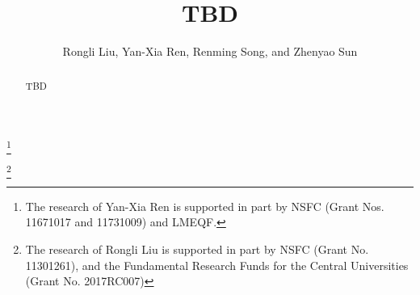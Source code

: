 \documentclass[12pt,a4paper]{amsart}
\numberwithin{equation}{section}
\theoremstyle{plain}
\theoremstyle{definition}
\theoremstyle{remark}
\begin{document}
\title{TBD} %
\author[R. Liu, Y.-X. Ren, R. Song, and Z. Sun]{Rongli Liu, Yan-Xia Ren, Renming Song, and Zhenyao Sun}
\address{Yan-Xia Ren\\ LMAM School of Mathematical Sciences \& Center for
Statistical Science\\ Peking University\\ Beijing 100871\\ P. R. China}
\thanks{The research of Yan-Xia Ren is supported in part by NSFC (Grant Nos. 11671017 and 11731009)  and LMEQF.}
\address{Rongli Liu\\ Mathematics and Applied Mathematics\\ Beijing jiaotong University\\ Beijing 100044\\ P. R. China}
\thanks{The research of Rongli Liu is supported in part by NSFC (Grant No. 11301261), and the Fundamental Research Funds for the Central Universities (Grant No.  2017RC007)}
\address{Renming Song\\ Department of Mathematics\\ University of Illinois at Urbana-Champaign \\ Urbana \\ IL 61801\\ USA}
\address{Zhenyao Sun\\ Faculty of Industrial Engineering and Management \\ Technion, Isreal Institute of Technology \\ Haifa 3200003\\ Isreal}
\begin{abstract}
\begin{comment}
Suppose that $E$ is a locally compact separable metric space, and  that  $X =\{(X_t)_{t\geq 0}; (\mathbb P_\mu)_{\mu \in \mathcal M_f(E)}\}$  is a subcritical superprocess, where $\mathcal M_f(E)$ is the space of all finite Borel measures on $E$. Under some conditions on the mean semigroup of $X$, we prove that the the $Q$ process of $X$ exists, and they have equilibrium probability if and only if the moment condition $\int_El(x)\nu(dx)<\infty$ is satisfied.
We also show that the equilibrium probability is a size-biased measure of the Yaglom distribution. 
\end{comment}
	TBD %
\end{abstract}
\maketitle
\end{document}
